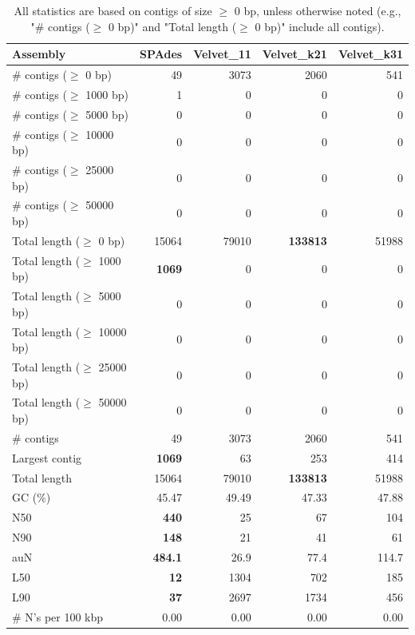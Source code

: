 \documentclass[12pt,a4paper]{article}
\begin{document}
\begin{table}[ht]
\begin{center}
\caption{All statistics are based on contigs of size $\geq$ 0 bp, unless otherwise noted (e.g., "\# contigs ($\geq$ 0 bp)" and "Total length ($\geq$ 0 bp)" include all contigs).}
\begin{tabular}{|l*{4}{|r}|}
\hline
Assembly & SPAdes & Velvet\_11 & Velvet\_k21 & Velvet\_k31 \\ \hline
\# contigs ($\geq$ 0 bp) & 49 & 3073 & 2060 & 541 \\ \hline
\# contigs ($\geq$ 1000 bp) & 1 & 0 & 0 & 0 \\ \hline
\# contigs ($\geq$ 5000 bp) & 0 & 0 & 0 & 0 \\ \hline
\# contigs ($\geq$ 10000 bp) & 0 & 0 & 0 & 0 \\ \hline
\# contigs ($\geq$ 25000 bp) & 0 & 0 & 0 & 0 \\ \hline
\# contigs ($\geq$ 50000 bp) & 0 & 0 & 0 & 0 \\ \hline
Total length ($\geq$ 0 bp) & 15064 & 79010 & {\bf 133813} & 51988 \\ \hline
Total length ($\geq$ 1000 bp) & {\bf 1069} & 0 & 0 & 0 \\ \hline
Total length ($\geq$ 5000 bp) & 0 & 0 & 0 & 0 \\ \hline
Total length ($\geq$ 10000 bp) & 0 & 0 & 0 & 0 \\ \hline
Total length ($\geq$ 25000 bp) & 0 & 0 & 0 & 0 \\ \hline
Total length ($\geq$ 50000 bp) & 0 & 0 & 0 & 0 \\ \hline
\# contigs & 49 & 3073 & 2060 & 541 \\ \hline
Largest contig & {\bf 1069} & 63 & 253 & 414 \\ \hline
Total length & 15064 & 79010 & {\bf 133813} & 51988 \\ \hline
GC (\%) & 45.47 & 49.49 & 47.33 & 47.88 \\ \hline
N50 & {\bf 440} & 25 & 67 & 104 \\ \hline
N90 & {\bf 148} & 21 & 41 & 61 \\ \hline
auN & {\bf 484.1} & 26.9 & 77.4 & 114.7 \\ \hline
L50 & {\bf 12} & 1304 & 702 & 185 \\ \hline
L90 & {\bf 37} & 2697 & 1734 & 456 \\ \hline
\# N's per 100 kbp & 0.00 & 0.00 & 0.00 & 0.00 \\ \hline
\end{tabular}
\end{center}
\end{table}
\end{document}
